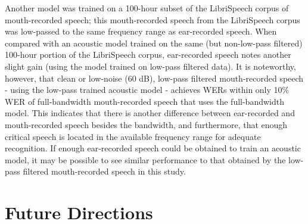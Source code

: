 Another model was trained on a 100-hour subset of the LibriSpeech corpus of mouth-recorded speech; this mouth-recorded speech from the LibriSpeech corpus was low-passed to the same frequency range as ear-recorded speech.  When compared with an acoustic model trained on the same (but non-low-pass filtered) 100-hour portion of the LibriSpeech corpus, ear-recorded speech notes another slight gain (using the model trained on low-pass filtered data).  It is noteworthy, however, that clean or low-noise (60 dB), low-pass filtered mouth-recorded speech - using the low-pass trained acoustic model - achieves WERs within only 10\% WER of full-bandwidth mouth-recorded speech that uses the full-bandwidth model.  This indicates that there is another difference between ear-recorded and mouth-recorded speech besides the bandwidth, and furthermore, that enough critical speech is located in the available frequency range for adequate recognition.  If enough ear-recorded speech could be obtained to train an acoustic model, it may be possible to see similar performance to that obtained by the low-pass filtered mouth-recorded speech in this study.




\section{Future Directions}\label{chap5:future-research}

